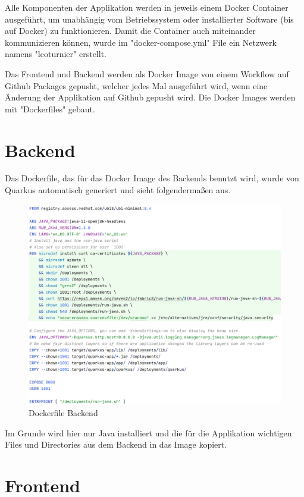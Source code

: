 Alle Komponenten der Applikation werden in jeweils einem Docker Container ausgeführt, um unabhängig vom Betriebssystem oder installierter Software (bis auf Docker) zu funktionieren. 
Damit die Container auch miteinander kommunizieren können, wurde im "docker-compose.yml" File ein Netzwerk namens "leoturnier" erstellt.

Das Frontend und Backend werden als Docker Image von einem Workflow auf Github Packages gepusht, welcher jedes Mal ausgeführt wird, wenn eine Änderung der Applikation auf Github gepusht wird.
Die Docker Images werden mit "Dockerfiles" gebaut. 

\section{Backend}

Das Dockerfile, das für das Docker Image des Backends benutzt wird, wurde von Quarkus automatisch generiert und sieht folgendermaßen aus. 

\begin{figure}[H]
    \includegraphics[scale=0.44]{pics/docker/dockerfile_backend.png}
    \caption{Dockerfile Backend}
\end{figure}

Im Grunde wird hier nur Java installiert und die für die Applikation wichtigen Files und Directories aus dem Backend in das Image kopiert.

\section{Frontend}

